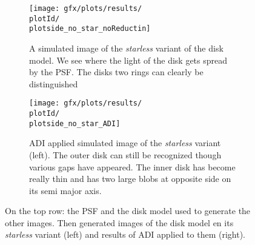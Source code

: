 \begin{figure}[!hbt]
{\begin{minipage}[t]{1.2\textwidth}
      \begin{subfigure}[t]{0.6\textwidth}
        \centering
        \texttt{[image: gfx/plots/results/\\plotId/\\plotside\_no\_star\_noReductin]}
        \caption[]{A simulated image of the \textit{starless} variant of the disk model. We see where the light of the disk gets spread by the PSF. The disks two rings can clearly be distinguished}
      \end{subfigure}%
      \begin{subfigure}[t]{0.6\textwidth}
        \centering
        \texttt{[image: gfx/plots/results/\\plotId/\\plotside\_no\_star\_ADI]}
        \caption[]{\ac{ADI} applied simulated image of the \textit{starless} variant (left). The outer disk can still be recognized though various gaps have appeared. The inner disk has become really thin and has two large blobs at opposite side on its semi major axis.}
      \end{subfigure}
  \end{minipage}
  }%

  \caption[]{On the top row: the \ac{PSF} and the disk model used to generate the other images. Then generated images of the disk model en its \textit{starless} variant (left) and results of \ac{ADI} applied to them (right).}
  \label{fig:\plotside:apd\plotId}
\end{figure}

